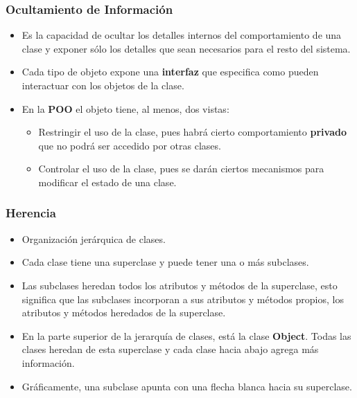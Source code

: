 \documentclass{beamer}
\begin{document}
  \begin{frame}
    \frametitle{Ocultamiento de Información}

    \begin{itemize}
      
    \item Es la capacidad de ocultar los detalles internos del
      comportamiento de una clase y exponer sólo los detalles que sean
      necesarios para el resto del sistema.
      
    \item Cada tipo de objeto expone una \textbf{interfaz} que
      especifica como pueden interactuar con los objetos de la clase.
      
    \item En la \textbf{POO} el objeto tiene, al menos, dos vistas:
      \begin{itemize}
        
      \item[] Restringir el uso de la clase, pues habrá cierto
        comportamiento \textbf{privado} que no podrá ser accedido por
        otras clases.
        
      \item[] Controlar el uso de la clase, pues se darán ciertos
        mecanismos para modificar el estado de una clase.
        
      \end{itemize}      
    \end{itemize}
  \end{frame}

  \begin{frame}
    \frametitle{Herencia}

    \begin{itemize}
    \item Organización jerárquica de clases.
      
    \item Cada clase tiene una superclase y puede tener una o más
      subclases.
      
    \item Las subclases heredan todos los atributos y métodos de la
      superclase, esto significa que las subclases incorporan a sus
      atributos y métodos propios, los atributos y métodos heredados
      de la superclase.
      
    \item En la parte superior de la jerarquía de clases, está la
      clase \textbf{Object}. Todas las clases heredan de esta
      superclase y cada clase hacia abajo agrega más información.

    \item Gráficamente, una subclase apunta con una flecha blanca
      hacia su superclase.
    \end{itemize}

  \end{frame}
\end{document}
